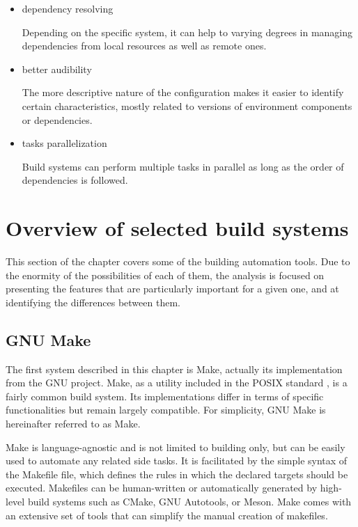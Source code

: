 \begin{itemize}
\item
  dependency resolving

Depending on the specific system, it can help to varying degrees in
managing dependencies from local resources as well as remote ones.
\end{itemize}

\begin{itemize}
\item
  better audibility

The more descriptive nature of the configuration makes it easier to
identify certain characteristics, mostly related to versions of
environment components or dependencies.
\end{itemize}

\begin{itemize}
\item
  tasks parallelization

Build systems can perform multiple tasks in parallel as long as the order
of dependencies is followed.
\end{itemize}

\hypertarget{overview-of-selected-build-systems}{%
\section{Overview of selected build
systems}\label{overview-of-selected-build-systems}}

This section of the chapter covers some of the building automation
tools. Due to the enormity of the possibilities of each of them, the
analysis is focused on presenting the features that are particularly
important for a given one, and at identifying the differences between
them.

\hypertarget{gnu-make}{%
\subsection{GNU Make}\label{gnu-make}}

The first system described in this chapter is Make, actually its
implementation from the GNU project. Make, as a utility included in the
POSIX standard \cite{MAKEPOSIX}, is a fairly common build system. Its implementations
differ in terms of specific functionalities but remain largely
compatible. For simplicity, GNU Make is hereinafter referred to as Make.

Make is language-agnostic and is not limited to building only, but can
be easily used to automate any related side tasks. It is facilitated by
the simple syntax of the Makefile file, which defines the rules in which
the declared targets should be executed. Makefiles can be human-written
or automatically generated by high-level build systems such as CMake,
GNU Autotools, or Meson. Make comes with an extensive set of tools that
can simplify the manual creation of makefiles.

